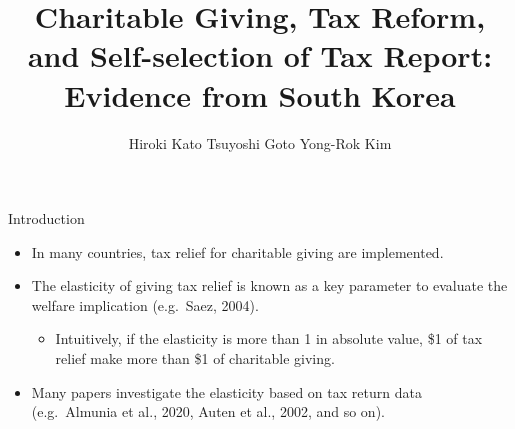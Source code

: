 \documentclass[dvipdfmx,10pt]{beamer}
\begin{document}
	\author{Hiroki Kato
		Tsuyoshi Goto
		Yong-Rok Kim}
	\title{Charitable Giving, Tax Reform, and Self-selection of Tax Report:
		Evidence from South Korea}
	\begin{frame}[plain]
		\maketitle
	\end{frame}
	
	\begin{frame}{Introduction}
		\protect\hypertarget{introduction}{}
		\begin{itemize}
			\item
			In many countries, tax relief for charitable giving are implemented.
			\item
			The elasticity of giving tax relief is known as a key parameter to evaluate the welfare implication (e.g.~Saez, 2004).
			
			\begin{itemize}
				\item
				Intuitively, if the elasticity is more than 1 in absolute value, \$1 of tax relief make more than \$1 of charitable giving.
			\end{itemize}
			\item
			Many papers investigate the elasticity based on tax return data (e.g.~Almunia et al., 2020, Auten et al., 2002, and so on).
		\end{itemize}
	\end{frame}
	
\end{document}
